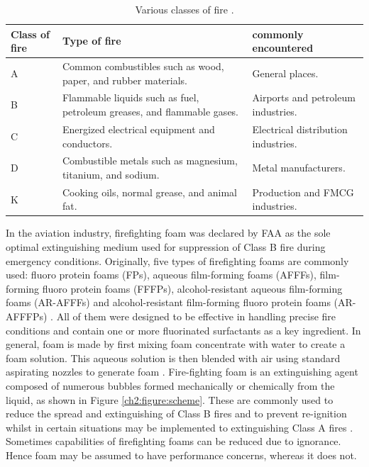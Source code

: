 \documentclass[12pt]{report}
\begin{document}
\begin{table}[H]
\centering
\caption{Various classes of fire \cite{hinnant2020characterizing}.}
\begin{tabular}{ m{} m{} m{} }
\hline
Class of fire & Type of fire & commonly encountered \\ 
\hline
A & Common combustibles such as wood, paper, and rubber materials. & General places. \\
B & Flammable liquids such as fuel, petroleum greases, and flammable gases. & Airports and petroleum industries. \\
C & Energized electrical equipment and conductors. & Electrical distribution industries. \\
D & Combustible metals such as magnesium, titanium, and sodium. & Metal manufacturers. \\ 
K & Cooking oils, normal grease, and animal fat. & Production and FMCG industries. \\
\hline
\end{tabular}
\label{ch2:table:classes}
\end{table}

In the aviation industry, firefighting foam was declared by FAA as the sole optimal extinguishing medium used for suppression of Class B fire during emergency conditions. Originally, five types of firefighting foams are commonly used: fluoro protein foams (FPs), aqueous film-forming foams (AFFFs), film-forming fluoro protein foams (FFFPs), alcohol-resistant aqueous film-forming foams (AR-AFFFs) and alcohol-resistant film-forming fluoro protein foams (AR-AFFFPs) \cite{george2002introduction}. All of them were designed to be effective in handling precise fire conditions and contain one or more fluorinated surfactants as a key ingredient.
In general, foam is made by first mixing foam concentrate with water to create a foam solution. This aqueous solution is then blended with air using standard aspirating nozzles to generate foam \cite{george2002introduction}.  Fire-fighting foam is an extinguishing agent composed of numerous bubbles formed mechanically or chemically from the liquid, as shown in Figure \ref{ch2:figure:scheme}. These are commonly used to reduce the spread and extinguishing of Class B fires and to prevent re-ignition whilst in certain situations may be implemented to extinguishing Class A fires \cite{oguike2013study}. Sometimes capabilities of firefighting foams can be reduced due to ignorance. Hence foam may be assumed to have performance concerns, whereas it does not. 
\end{document}
